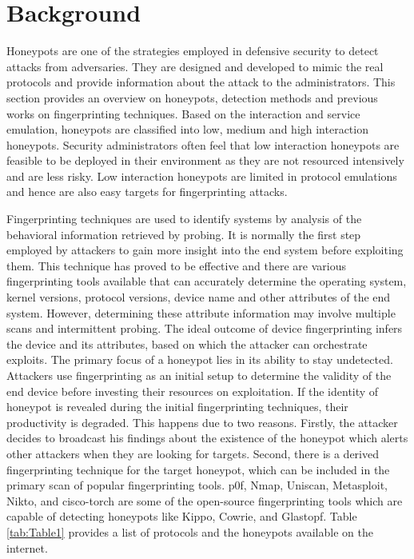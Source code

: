 \section{Background}
\label{sec:back}

Honeypots are one of the strategies employed in defensive security to detect attacks from adversaries. They are designed and developed to mimic the real protocols and provide information about the attack to the administrators. This section provides an overview on honeypots, detection methods and previous works on fingerprinting techniques. Based on the interaction and service emulation, honeypots are classified into low, medium and high interaction honeypots. Security administrators often feel that low interaction honeypots are feasible to be deployed in their environment as they are not resourced intensively and are less risky. Low interaction honeypots are limited in protocol emulations and hence are also easy targets for fingerprinting attacks. 

Fingerprinting techniques are used to identify systems by analysis of the behavioral information retrieved by probing. It is normally the first step employed by attackers to gain more insight into the end system before exploiting them. This technique has proved to be effective and there are various fingerprinting tools available that can accurately determine the operating system, kernel versions, protocol versions, device name and other attributes of the end system. However, determining these attribute information may involve multiple scans and intermittent probing. The ideal outcome of device fingerprinting infers the device and its attributes, based on which the attacker can orchestrate exploits. The primary focus of a honeypot lies in its ability to stay undetected. Attackers use fingerprinting as an initial setup to determine the validity of the end device before investing their resources on exploitation. If the identity of honeypot is revealed during the initial fingerprinting techniques, their productivity is degraded. This happens due to two reasons. Firstly, the attacker decides to broadcast his findings about the existence of the honeypot which alerts other attackers when they are looking for targets. Second, there is a derived fingerprinting technique for the target honeypot, which can be included in the primary scan of popular fingerprinting tools. p0f, Nmap, Uniscan, Metasploit, Nikto, and cisco-torch are some of the open-source fingerprinting tools which are capable of detecting honeypots like Kippo, Cowrie, and Glastopf. Table \ref{tab:Table1} provides a list of protocols and the honeypots available on the internet. 

